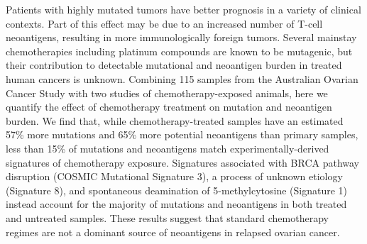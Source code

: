 Patients with highly mutated tumors have better prognosis in a variety of clinical contexts. Part of this effect may be due to an increased number of T-cell neoantigens, resulting in more immunologically foreign tumors. Several mainstay chemotherapies including platinum compounds are known to be mutagenic, but their contribution to detectable mutational and neoantigen burden in treated human cancers is unknown. Combining 115 samples from the Australian Ovarian Cancer Study with two studies of chemotherapy-exposed animals, here we quantify the effect of chemotherapy treatment on mutation and neoantigen burden. We find that, while chemotherapy-treated samples have an estimated 57\% more mutations and 65\% more potential neoantigens than primary samples, less than 15\% of mutations and neoantigens match experimentally-derived signatures of chemotherapy exposure. Signatures associated with BRCA pathway disruption (COSMIC Mutational Signature 3), a process of unknown etiology (Signature 8), and spontaneous deamination of 5-methylcytosine (Signature 1) instead account for the majority of mutations and neoantigens in both treated and untreated samples. These results suggest that standard chemotherapy regimes are not a dominant source of neoantigens in relapsed ovarian cancer.

